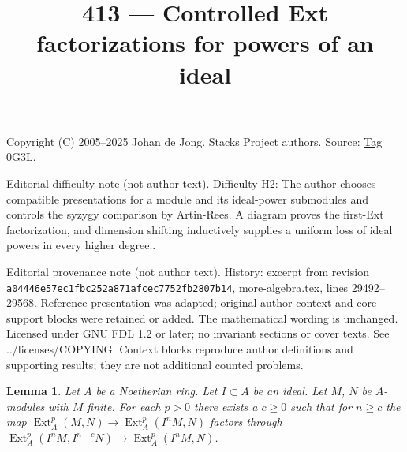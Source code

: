 \documentclass{amsart}
\theoremstyle{plain}
\newtheorem{lemma}[subsection]{Lemma}
\theoremstyle{definition}
\theoremstyle{remark}
\numberwithin{equation}{subsection}
\def\Ext{\mathop{\mathrm{Ext}}\nolimits}
\begin{document}
\title[Stacks Project, Tag 0G3L]{413 --- Controlled Ext factorizations for powers of an ideal}
\maketitle
\noindent Copyright (C) 2005--2025 Johan de Jong. Stacks Project authors. Source: \href{https://stacks.math.columbia.edu/tag/0G3L}{Tag 0G3L}.

\noindent Editorial difficulty note (not author text). Difficulty H2: The author chooses compatible presentations for a module and its ideal-power submodules and controls the syzygy comparison by Artin-Rees. A diagram proves the first-Ext factorization, and dimension shifting inductively supplies a uniform loss of ideal powers in every higher degree..

\noindent Editorial provenance note (not author text). History: excerpt from revision \texttt{a0444\allowbreak 6e57e\allowbreak c1fbc\allowbreak 252a8\allowbreak 71afc\allowbreak ec775\allowbreak 2fb28\allowbreak 07b14}, more-algebra.tex, lines 29492--29568. Reference presentation was adapted; original-author context and core support blocks were retained or added. The mathematical wording is unchanged. Licensed under GNU FDL 1.2 or later; no invariant sections or cover texts. See ../licenses/COPYING. Context blocks reproduce author definitions and supporting results; they are not additional counted problems.

\begin{lemma}
\label{lemma-ext-factors}
Let $A$ be a Noetherian ring. Let $I \subset A$ be an ideal.
Let $M$, $N$ be $A$-modules with $M$ finite. For each $p > 0$ there exists a
$c \geq 0$ such that for $n \geq c$ the map
$\Ext_A^p(M, N) \to \Ext_A^p(I^nM, N)$
factors through $\Ext^p_A(I^nM, I^{n - c}N) \to \Ext_A^p(I^nM, N)$.
\end{lemma}
\end{document}
